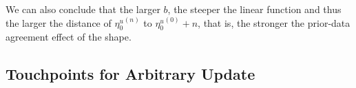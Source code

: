 \documentclass[runningheads,a4paper]{llncs}
\newcommand{\uz}{^{(0)}} %
\newcommand{\un}{^{(n)}} %
\begin{document}
We can also conclude that the larger $b$, the steeper the linear function
and thus the larger the distance of ${\eta_0^u}\un$ to ${\eta_0^u}\uz + n$,
that is, the stronger the prior-data agreement effect of the shape.

\subsection{Touchpoints for Arbitrary Update}
\label{sec:generalupdate}
\end{document}
